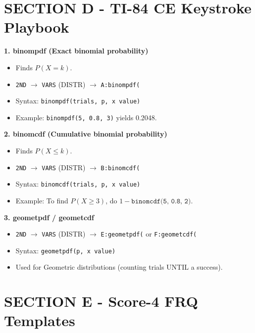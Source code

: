 \section{SECTION D - TI-84 CE Keystroke Playbook}
\begin{calculatorbox}
\textbf{1. binompdf (Exact binomial probability)}
\begin{itemize}
    \item Finds $P(X = k)$.
    \item \texttt{2ND} $\rightarrow$ \texttt{VARS} (DISTR) $\rightarrow$ \texttt{A:binompdf(}
    \item Syntax: \texttt{binompdf(trials, p, x value)}
    \item Example: \texttt{binompdf(5, 0.8, 3)} yields 0.2048.
\end{itemize}

\textbf{2. binomcdf (Cumulative binomial probability)}
\begin{itemize}
    \item Finds $P(X \leq k)$.
    \item \texttt{2ND} $\rightarrow$ \texttt{VARS} (DISTR) $\rightarrow$ \texttt{B:binomcdf(}
    \item Syntax: \texttt{binomcdf(trials, p, x value)}
    \item Example: To find $P(X \geq 3)$, do $1 - \texttt{binomcdf(5, 0.8, 2)}$.
\end{itemize}

\textbf{3. geometpdf / geometcdf}
\begin{itemize}
    \item \texttt{2ND} $\rightarrow$ \texttt{VARS} (DISTR) $\rightarrow$ \texttt{E:geometpdf(} or \texttt{F:geometcdf(}
    \item Syntax: \texttt{geometpdf(p, x value)}
    \item Used for Geometric distributions (counting trials UNTIL a success).
\end{itemize}
\end{calculatorbox}

\section{SECTION E - Score-4 FRQ Templates}

